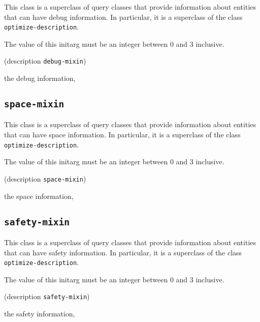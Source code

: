 {\footnotesize
{}
}
This class is a superclass of query classes that provide information
about entities that can have debug information.  In particular, it is a
superclass of the class \texttt{optimize-description}.

{\footnotesize
{}
}

The value of this initarg must be an integer between $0$ and $3$
inclusive.

{\footnotesize
{} {(description {\tt debug-mixin})}
}

 the debug information, 

\subsection{\texttt{space-mixin}}
\label{sec-space-mixin}

{\footnotesize
{}
}

This class is a superclass of query classes that provide information
about entities that can have space information.  In particular, it is a
superclass of the class \texttt{optimize-description}.

{\footnotesize
{}
}

The value of this initarg must be an integer between $0$ and $3$
inclusive.

{\footnotesize
{} {(description {\tt space-mixin})}
}

 the space information, 

\subsection{\texttt{safety-mixin}}
\label{sec-safety-mixin}

{\footnotesize
{}
}

This class is a superclass of query classes that provide information
about entities that can have safety information.  In particular, it is a
superclass of the class \texttt{optimize-description}.

{\footnotesize
{}
}

The value of this initarg must be an integer between $0$ and $3$
inclusive.

{\footnotesize
{} {(description {\tt safety-mixin})}
}

 the safety information, 

